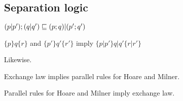 \documentclass{article}
\begin{document}
\subsection*{Separation logic}

\begin{axiom}
\end{axiom}

\begin{law}[Exchange]
$(p|p');(q|q') \sqsubseteq (p;q)|(p';q')$
\end{law}

\begin{rul}
$\{p\}q\{r\}$ and $\{p'\}q'\{r'\}$ imply $\{p|p'\} q|q' \{r|r'\}$
\end{rul}

\begin{rul}
Likewise.
\end{rul}

\begin{theorem}
Exchange law implies parallel rules for Hoare and Milner.
\end{theorem}

\begin{theorem}
Parallel rules for Hoare and Milner imply exchange law.
\end{theorem}
\end{document}
